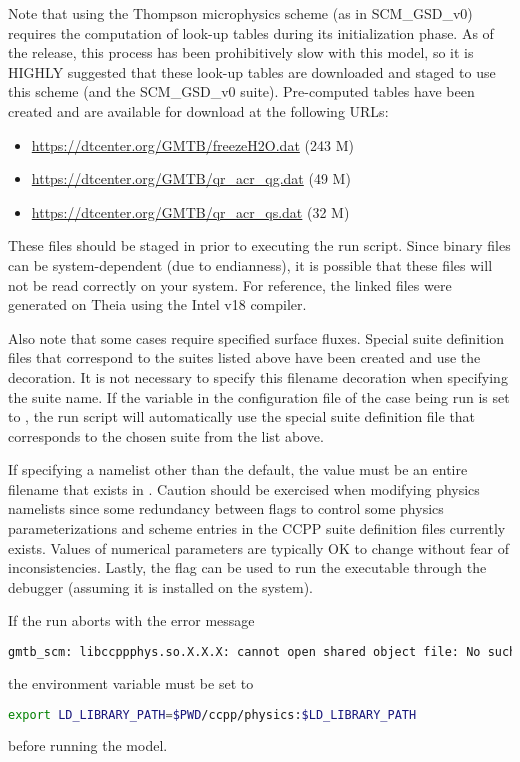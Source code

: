 Note that using the Thompson microphysics scheme (as in SCM\_GSD\_v0) requires the computation of look-up tables during its initialization phase. As of the release, this process has been prohibitively slow with this model, so it is HIGHLY suggested that these look-up tables are downloaded and staged to use this scheme (and the SCM\_GSD\_v0 suite). Pre-computed tables have been created and are available for download at the following URLs:
\begin{itemize}
\item \url{https://dtcenter.org/GMTB/freezeH2O.dat} (243 M)
\item \url{https://dtcenter.org/GMTB/qr_acr_qg.dat} (49 M)
\item \url{https://dtcenter.org/GMTB/qr_acr_qs.dat} (32 M)
\end{itemize}
These files should be staged in  prior to executing the run script. Since binary files can be system-dependent (due to endianness), it is possible that these files will not be read correctly on your system. For reference, the linked files were generated on Theia using the Intel v18 compiler.

Also note that some cases require specified surface fluxes. Special suite definition files that correspond to the suites listed above have been created and use the  decoration. It is not necessary to specify this filename decoration when specifying the suite name. If the  variable in the configuration file of the case being run is set to , the run script will automatically use the special suite definition file that corresponds to the chosen suite from the list above.

If specifying a namelist other than the default, the value must be an entire filename that exists in . Caution should be exercised when modifying physics namelists since some redundancy between flags to control some physics parameterizations and scheme entries in the CCPP suite definition files currently exists. Values of numerical parameters are typically OK to change without fear of inconsistencies. Lastly, the  flag can be used to run the executable through the  debugger (assuming it is installed on the system).

If the run aborts with the error message
\begin{lstlisting}[language=bash]
gmtb_scm: libccppphys.so.X.X.X: cannot open shared object file: No such file or directory
\end{lstlisting}
the environment variable  must be set to
\begin{lstlisting}[language=bash]
export LD_LIBRARY_PATH=$PWD/ccpp/physics:$LD_LIBRARY_PATH
\end{lstlisting}
before running the model.

